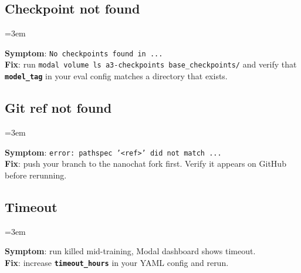 \documentclass[9pt]{extarticle}
\newcommand{\cmd}[1]{\colorbox{gray!10}{\texttt{#1}}}
\newcommand{\field}[1]{\texttt{\textbf{#1}}}
\begin{document}
\subsection*{Checkpoint not found}
\leftskip=3em

\textbf{Symptom}: \cmd{No checkpoints found in ...}\\
\textbf{Fix}: run \cmd{modal volume ls a3-checkpoints base\_checkpoints/} and verify that \field{model\_tag} in your eval config matches a directory that exists.

\subsection*{Git ref not found}
\leftskip=3em

\textbf{Symptom}: \cmd{error: pathspec '<ref>' did not match ...}\\
\textbf{Fix}: push your branch to the nanochat fork first. Verify it appears on GitHub before rerunning.

\subsection*{Timeout}
\leftskip=3em

\textbf{Symptom}: run killed mid-training, Modal dashboard shows timeout.\\
\textbf{Fix}: increase \field{timeout\_hours} in your YAML config and rerun.
\end{document}
